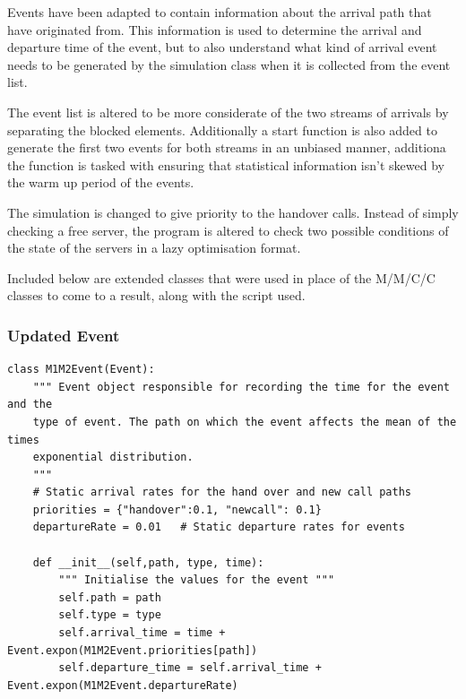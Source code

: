 \documentclass{ecmm427_assignment}
\begin{document}
Events have been adapted to contain information about the arrival path that have originated from. This information is used to determine the arrival and departure time of the event, but to also understand what kind of arrival event needs to be generated by the simulation class when it is collected from the event list.

The event list is altered to be more considerate of the two streams of arrivals by separating the blocked elements. Additionally a start function is also added to generate the first two events for both streams in an unbiased manner, additiona the function is tasked with ensuring that statistical information isn't skewed by the warm up period of the events.

The simulation is changed to give priority to the handover calls. Instead of simply checking a free server, the program is altered to check two possible conditions of the state of the servers in a lazy optimisation format.

Included below are extended classes that were used in place of the M/M/C/C classes to come to a result, along with the script used.

\subsubsection{Updated Event}
\begin{verbatim}
class M1M2Event(Event):
    """ Event object responsible for recording the time for the event and the 
    type of event. The path on which the event affects the mean of the times
    exponential distribution.
    """
    # Static arrival rates for the hand over and new call paths
    priorities = {"handover":0.1, "newcall": 0.1}  
    departureRate = 0.01   # Static departure rates for events

    def __init__(self,path, type, time):
        """ Initialise the values for the event """
        self.path = path
        self.type = type
        self.arrival_time = time + Event.expon(M1M2Event.priorities[path])
        self.departure_time = self.arrival_time + Event.expon(M1M2Event.departureRate)
\end{verbatim}
\end{document}
